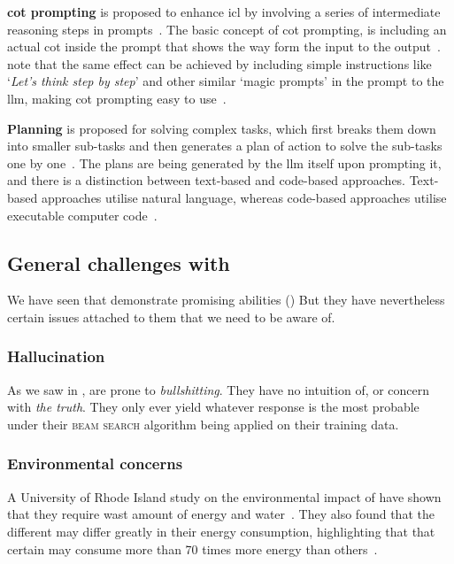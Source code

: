 \textbf{\acrfull{cot} prompting} is proposed to enhance \acrlong{icl} by involving a
series of intermediate reasoning steps in prompts~\cite[44, 52]{llmSurvey}. The basic concept of
\acrshort{cot} prompting, is including an actual \acrlong{cot} inside the prompt that shows the way
form the input to the output~\cite[52]{llmSurvey}.~\citeauthor{llmSurvey} note that the same effect
can be achieved by including simple instructions like `\textit{Let's think step by step}' and other
similar `magic prompts' in the prompt to the \acrshort{llm}, making \acrshort{cot} prompting easy to
use~\cite[52]{llmSurvey}.

\textbf{Planning} is proposed for solving complex tasks, which first breaks them down into smaller
sub-tasks and then generates a plan of action to solve the sub-tasks one by
one~\cite[44, 54]{llmSurvey}. The plans are being generated by the \acrshort{llm} itself upon
prompting it, and there is a distinction between text-based and code-based approaches. Text-based
approaches utilise natural language, whereas code-based approaches utilise executable computer code~\cite[54-55]{llmSurvey}.


\subsection{General challenges with }\label{sec:llmProblems}

We have seen that  demonstrate promising abilities () But they have nevertheless certain issues attached to them that we need to be aware of.

\subsubsection{Hallucination}\label{sec:llmHallucination}

As we saw in ,  are prone to
\textit{bullshitting}. They have no intuition of, or concern with \textit{the
    truth}. They only ever yield whatever response is the most probable under their
\textsc{beam search} algorithm being applied on their training data.

\subsubsection{Environmental concerns}

A University of Rhode Island study on the environmental impact of  have shown that
they require wast amount of energy and water~\cite{hungryLlm}. They also found that the different
 may differ greatly in their energy consumption, highlighting that that certain
 may consume more than \num{70} times more energy than others~\cite{hungryLlm}.

